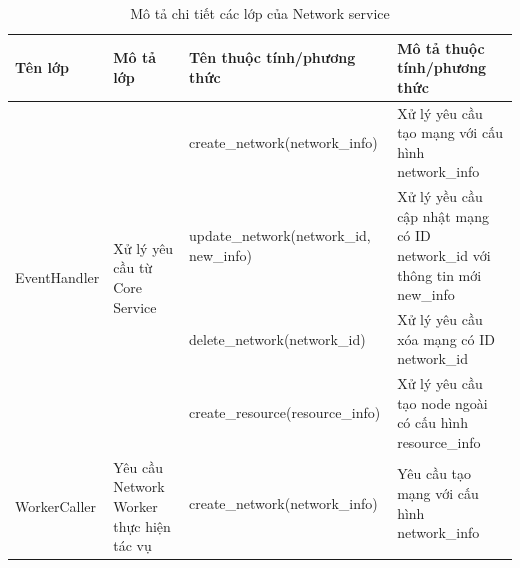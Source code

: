 \documentclass[../DoAn.tex]{subfiles}
\begin{document}
\begin{longtable}{|p{}|p{}|p{}|p{}|}
    \caption{Mô tả chi tiết các lớp của Network service}
    \label{tab:classNetworkService}                                                                                                                                                                                                                                             \\
    \hline
    Tên lớp                                                  & Mô tả lớp                                                               & Tên thuộc tính/phương thức                                 & Mô tả thuộc tính/phương thức                                              \\ \hline
    \endhead
    \multirow[t]{4}{0.2\textwidth}{\hspace{0pt}EventHandler} & \multirow[t]{4}{0.2\textwidth}{Xử lý yêu cầu từ Core Service}          & create\_network\hspace{0pt}(network\_info)                 & Xử lý yêu cầu tạo mạng với cấu hình network\_info                         \\ \cline{3-4}
                                                             &                                                                         & update\_network\hspace{0pt}(network\_id, new\_info)        & Xử lý yều cầu cập nhật mạng có ID network\_id với thông tin mới new\_info \\ \cline{3-4}
                                                             &                                                                         & delete\_network\hspace{0pt}(network\_id)                   & Xử lý yêu cầu xóa mạng có ID network\_id                                  \\ \cline{3-4}
                                                             &                                                                         & create\_resource\hspace{0pt}(resource\_info)               & Xử lý yêu cầu tạo node ngoài có cấu hình resource\_info                   \\ \hline
    \multirow[t]{4}{0.2\textwidth}{\hspace{0pt}WorkerCaller} & \multirow[t]{4}{0.2\textwidth}{Yêu cầu Network Worker thực hiện tác vụ} & create\_network\hspace{0pt}(network\_info)                 & Yêu cầu tạo mạng với cấu hình network\_info                               \\ \cline{3-4}

\end{longtable}
\end{document}
